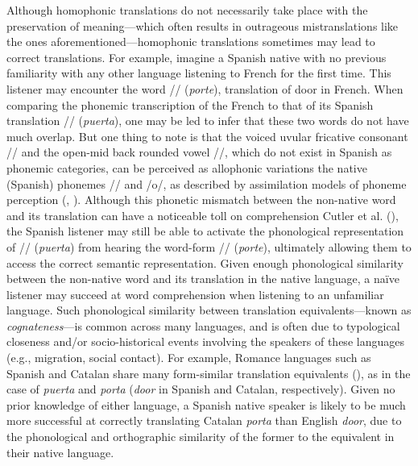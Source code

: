 \documentclass[
]{article}
\begin{document}
Although homophonic translations do not necessarily take place with the
preservation of meaning---which often results in outrageous
mistranslations like the ones aforementioned---homophonic translations
sometimes may lead to correct translations. For example, imagine a
Spanish native with no previous familiarity with any other language
listening to French for the first time. This listener may encounter the
word // (\emph{porte}), translation of door in French.
When comparing the phonemic transcription of the French to that of its
Spanish translation // (\emph{puerta}), one may be led
to infer that these two words do not have much overlap. But one thing to
note is that the voiced uvular fricative consonant // and the
open-mid back rounded vowel //, which do not exist in Spanish
as phonemic categories, can be perceived as allophonic variations the
native (Spanish) phonemes // and /o/, as described by
assimilation models of phoneme perception
(,
). Although this phonetic
mismatch between the non-native word and its translation can have a
noticeable toll on comprehension Cutler et al.
(), the Spanish listener may
still be able to activate the phonological representation of
// (\emph{puerta}) from hearing the word-form
// (\emph{porte}), ultimately allowing them to access the
correct semantic representation. Given enough phonological similarity
between the non-native word and its translation in the native language,
a naïve listener may succeed at word comprehension when listening to an
unfamiliar language. Such phonological similarity between translation
equivalents---known as \emph{cognateness}---is common across many
languages, and is often due to typological closeness and/or
socio-historical events involving the speakers of these languages (e.g.,
migration, social contact). For example, Romance languages such as
Spanish and Catalan share many form-similar translation equivalents
(), as in
the case of \emph{puerta} and \emph{porta} (\emph{door} in Spanish and
Catalan, respectively). Given no prior knowledge of either language, a
Spanish native speaker is likely to be much more successful at correctly
translating Catalan \emph{porta} than English \emph{door}, due to the
phonological and orthographic similarity of the former to the equivalent
in their native language.
\end{document}
